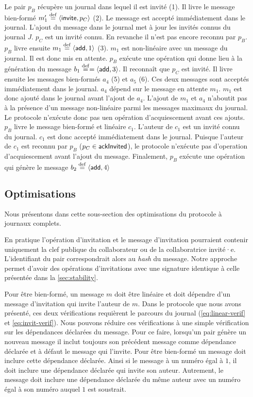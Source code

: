 Le pair $p_B$ récupère un journal dans lequel il est invité (1).
Il livre le message bien-formé $m_1' \defeq \tuple*{\trm{invite}, p_C}$ (2).
Le message est accepté immédiatement dans le journal.
L'ajout du message dans le journal met à jour les invités connus du journal $J$.
$p_C$ est un invité connu.
En revanche il n'est pas encore reconnu par $p_B$.
$p_B$ livre ensuite $m_1 \defeq \tuple*{\trm{add}, 1}$ (3).
$m_1$ est non-linéaire avec un message du journal.
Il est donc mis en attente.
$p_B$ exécute une opération qui donne lieu à la génération du message $b_1 \defeq = \tuple*{\trm{add}, 3}$.
Il reconnaît que $p_C$ est invité.
Il livre ensuite les messages bien-formés $a_4$ (5) et $a_5$ (6).
Ces deux messages sont acceptés immédiatement dans le journal.
$a_4$ dépend sur le message en attente $m_1$.
$m_1$ est donc ajouté dans le journal avant l'ajout de $a_4$.
L'ajout de $m_1$ et $a_4$ n'aboutit pas à la présence d'un message non-linéaire parmi les messages maximaux du journal.
Le protocole n'exécute donc pas uen opération d'acquiescement avant ces ajouts.
$p_B$ livre le message bien-formé et linéaire $c_1$.
L'auteur de $c_1$ est un invité connu du journal.
$c_1$ est donc accepté immédiatement dans le journal.
Puisque l'auteur de $c_1$ est reconnu par $p_B$ ($p_C \in \trm{ackInvited}$), le protocole n'exécute pas d'operation d'acquiescement avant l'ajout du message.
Finalement, $p_B$ exécute une opération qui génère le message $b_2 \defeq \tuple*{\trm{add},4}$


\subsection{Optimisations}\label{subsec:full-log-opti}

Nous présentons dans cette sous-section des optimisations du protocole à journaux complets.

En pratique l'opération d'invitation et le message d'invitation pourraient contenir uniquement la clef publique du collaborateur ou de la collaboratrice invité·e.
L'identifiant du pair correspondrait alors au \emph{hash} du message.
Notre approche permet d'avoir des opérations d'invitations avec une signature identique à celle présentée dans la \autoref{sec:stability}.

Pour être bien-formé, un message $m$ doit être linéaire et doit dépendre d'un message d'invitation qui invite l'auteur de $m$.
Dans le protocole que nous avons présenté, ces deux vérifications requièrent le parcours du journal (\autoref{eq:linear-verif} et \autoref{eq:invit-verif}).
Nous pouvons réduire ces vérifications à une simple vérification sur les dépendances déclarées du message.
Pour ce faire, lorsqu'un pair génère un nouveau message il inclut toujours son précédent message comme dépendance déclarée et à défaut le message qui l'invite.
Pour être bien-formé un message doit inclure cette dépendance déclarée.
Ainsi si le message à un numéro égal à $1$, il doit inclure une dépendance déclarée qui invite son auteur.
Autrement, le message doit inclure une dépendance déclarée du même auteur avec un numéro égal à son numéro auquel $1$ est soustrait.


